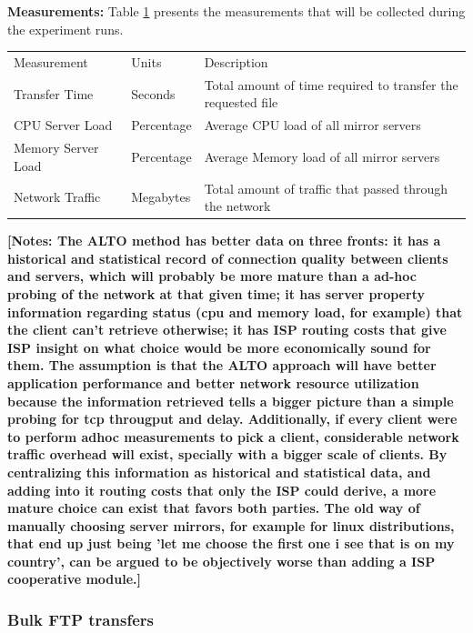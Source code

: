 \textbf{Measurements:} Table \ref{table:s2-measurements} presents the measurements that will be collected during the experiment runs.

\begin{table}[]
\begin{tabular}{lll}
Measurement         & Units      & Description                                                  \\
Transfer Time       & Seconds    & Total amount of time required to transfer the requested file \\
CPU Server Load     & Percentage & Average CPU load of all mirror servers \\
Memory Server Load  & Percentage & Average Memory load of all mirror servers \\
Network Traffic     & Megabytes  & Total amount of traffic that passed through the network
\end{tabular}
\label{table:s2-measurements}
\end{table}

\textbf{[Notes: The ALTO method has better data on three fronts: it has a historical and statistical record of connection quality between clients and servers, which will probably be more mature than a ad-hoc probing of the network at that given time; it has server property information regarding status (cpu and memory load, for example) that the client can't retrieve otherwise; it has ISP routing costs that give ISP insight on what choice would be more economically sound for them. The assumption is that the ALTO approach will have better application performance and better network resource utilization because the information retrieved tells a bigger picture than a simple probing for tcp througput and delay. Additionally, if every client were to perform adhoc measurements to pick a client, considerable network traffic overhead will exist, specially with a bigger scale of clients. By centralizing this information as historical and statistical data, and adding into it routing costs that only the ISP could derive, a more mature choice can exist that favors both parties. The old way of manually choosing server mirrors, for example for linux distributions, that end up just being 'let me choose the first one i see that is on my country', can be argued to be objectively worse than adding a ISP cooperative module.]}


\subsubsection{Bulk FTP transfers}

